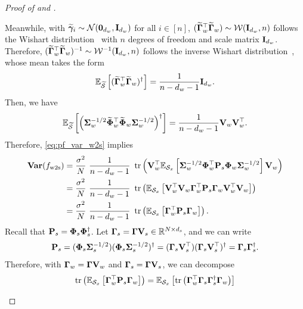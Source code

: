 \begin{proof}[Proof of  and ]
\begin{enumerate}[label=(\alph*)]
        Meanwhile, with $\widetilde{\boldsymbol{\gamma}}_i \sim \mathcal{N}(\textbf0_{d_w}, \mathbf{I}_{d_w})$ for all $i \in [n]$, $(\widetilde{\boldsymbol{\Gamma}}_w^\top \widetilde{\boldsymbol{\Gamma}}_w) \sim \mathcal{W}(\mathbf{I}_{d_w},n)$ follows the Wishart distribution~\citep[Definition 3.4.1]{wishart1928generalised} with $n$ degrees of freedom and scale matrix $\mathbf{I}_{d_w}$. 
        Therefore, $(\widetilde{\boldsymbol{\Gamma}}_w^\top \widetilde{\boldsymbol{\Gamma}}_w)^{-1} \sim \mathcal{W}^{-1}(\mathbf{I}_{d_w},n)$ follows the inverse Wishart distribution~\citep[\S 3.8]{mardia2024multivariate}, whose mean takes the form~\citep[(3.8.3)]{mardia2024multivariate}
        \begin{align*}
            \mathbb{E}_{\widetilde{{\mathcal{S}}}}\left[(\widetilde{\boldsymbol{\Gamma}}_w^\top \widetilde{\boldsymbol{\Gamma}}_w)^\dagger\right] = \frac{1}{n - d_w -1} \mathbf{I}_{d_w}.
        \end{align*}
        Then, we have
        \begin{align*}
            \mathbb{E}_{\widetilde{{\mathcal{S}}}}\left[\left(\boldsymbol{\Sigma}_w^{-1/2} \widetilde{\boldsymbol{\Phi}}_w^\top \widetilde{\boldsymbol{\Phi}}_w \boldsymbol{\Sigma}_w^{-1/2}\right)^\dagger\right]
            = \frac{1}{n - d_w -1} \mathbf{V}_w \mathbf{V}_w^\top.
        \end{align*}
        Therefore, \eqref{eq:pf_var_w2s} implies
        \begin{align}\label{eq:pf_var_w2s_1}
        \begin{split}
            \vari(f_\wts) &= \frac{\sigma^2}{N}\ \frac{1}{n - d_w -1}\ \tr\rbr{\Vb_w^\top \E_{\Scal_x}\sbr{\Sigmab_w^{-1/2} \Phib_w^\top \Pb_s \Phib_w \Sigmab_w^{-1/2}} \Vb_w} \\
            &= \frac{\sigma^2}{N}\ \frac{1}{n - d_w -1}\ \tr\rbr{\E_{\Scal_x}\sbr{\Vb_w^\top \Vb_w \Gammab_w^\top \Pb_s \Gammab_w \Vb_w^\top \Vb_w}} \\
            &= \frac{\sigma^2}{N}\ \frac{1}{n - d_w -1}\ \tr\rbr{\E_{\Scal_x}\sbr{\Gammab_w^\top \Pb_s \Gammab_w}}.
        \end{split}
        \end{align}
        Recall that $\mathbf{P}_s = \boldsymbol{\Phi}_s \boldsymbol{\Phi}_s^\dagger$. Let $\boldsymbol{\Gamma}_s = \boldsymbol{\Gamma} \mathbf{V}_s \in \mathbb{R}^{N \times d_s}$, and we can write
        \begin{align*}
            \mathbf{P}_s = (\boldsymbol{\Phi}_s \boldsymbol{\Sigma}_s^{-1/2}) (\boldsymbol{\Phi}_s \boldsymbol{\Sigma}_s^{-1/2})^\dagger = (\boldsymbol{\Gamma}_s \mathbf{V}_s^\top) (\boldsymbol{\Gamma}_s \mathbf{V}_s^\top)^\dagger = \boldsymbol{\Gamma}_s \boldsymbol{\Gamma}_s^\dagger.
        \end{align*}
        Therefore, with $\boldsymbol{\Gamma}_w = \boldsymbol{\Gamma} \mathbf{V}_w$ and $\boldsymbol{\Gamma}_s = \boldsymbol{\Gamma} \mathbf{V}_s$, we can decompose
        \begin{align*}
            \tr\rbr{\E_{\Scal_x}\sbr{\Gammab_w^\top \Pb_s \Gammab_w}} 
            &= \E_{\Scal_x}\sbr{\tr\rbr{\Gammab_w^\top \Gammab_s \Gammab_s^\dagger \Gammab_w}} \\

\end{align*}
\end{enumerate}
\end{proof}
